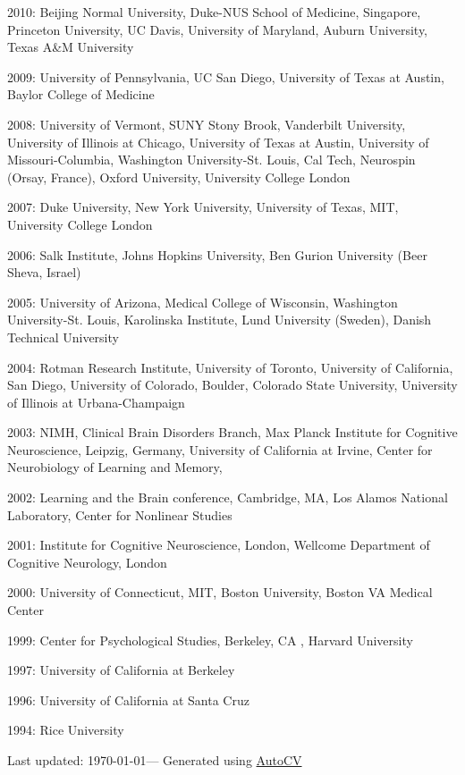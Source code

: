 \documentclass[10pt, letterpaper]{article}
\begin{document}
2010:  Beijing Normal University,  Duke-NUS School of Medicine, Singapore,  Princeton University,  UC Davis,  University of Maryland,  Auburn University,  Texas A\&M University 

2009:  University of Pennsylvania,  UC San Diego,  University of Texas at Austin,  Baylor College of Medicine

2008:  University of Vermont,  SUNY Stony Brook,  Vanderbilt University,  University of Illinois at Chicago,  University of Texas at Austin,  University of Missouri-Columbia,  Washington University-St. Louis,  Cal Tech,  Neurospin (Orsay, France),  Oxford University,  University College London

2007:  Duke University,  New York University,  University of Texas,  MIT,  University College London

2006:  Salk  Institute,  Johns Hopkins University,  Ben Gurion University (Beer Sheva, Israel)

2005:  University of Arizona,  Medical College of Wisconsin,  Washington University-St. Louis, Karolinska Institute, Lund University (Sweden), Danish Technical University

2004:  Rotman Research Institute, University of Toronto,  University of California, San Diego,  University of Colorado, Boulder,  Colorado State University,  University of Illinois at Urbana-Champaign

2003:  NIMH, Clinical Brain Disorders Branch,  Max Planck Institute for Cognitive Neuroscience, Leipzig, Germany,  University of California at Irvine, Center for Neurobiology of Learning and Memory,

2002:  Learning and the Brain conference, Cambridge, MA,  Los Alamos National Laboratory, Center for Nonlinear Studies

2001:  Institute for Cognitive Neuroscience, London,   Wellcome Department of Cognitive Neurology, London

2000:  University of Connecticut,  MIT,  Boston University,  Boston VA Medical Center

1999:  Center for Psychological Studies, Berkeley, CA ,  Harvard University

1997:  University of California at Berkeley 

1996:  University of California at Santa Cruz 

1994:  Rice University 


\begin{center}
{\footnotesize Last updated: \today — Generated using \href{https://github.com/poldrack/autoCV}{AutoCV} 
}
\end{center}
\end{document}
